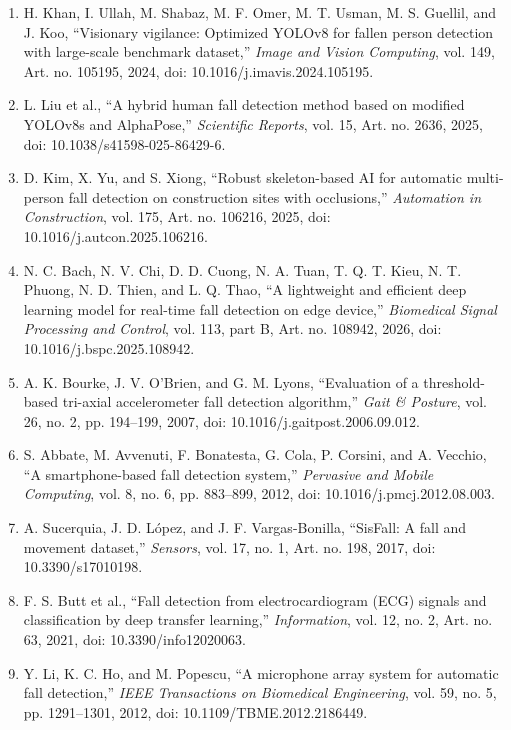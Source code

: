 \begin{enumerate}
    \item \label{ref:falldetection} H. Khan, I. Ullah, M. Shabaz, M. F. Omer, M. T. Usman, M. S. Guellil, and J. Koo, ``Visionary vigilance: Optimized YOLOv8 for fallen person detection with large-scale benchmark dataset,'' \textit{Image and Vision Computing}, vol. 149, Art. no. 105195, 2024, doi: 10.1016/j.imavis.2024.105195.
    \item \label{ref:hfdmia_pose} L. Liu et al., ``A hybrid human fall detection method based on modified YOLOv8s and AlphaPose,'' \textit{Scientific Reports}, vol. 15, Art. no. 2636, 2025, doi: 10.1038/s41598-025-86429-6.
    \item \label{ref:yosap_lstm} D. Kim, X. Yu, and S. Xiong, ``Robust skeleton-based AI for automatic multi-person fall detection on construction sites with occlusions,'' \textit{Automation in Construction}, vol. 175, Art. no. 106216, 2025, doi: 10.1016/j.autcon.2025.106216.
    \item \label{ref:fallnet} N. C. Bach, N. V. Chi, D. D. Cuong, N. A. Tuan, T. Q. T. Kieu, N. T. Phuong, N. D. Thien, and L. Q. Thao, ``A lightweight and efficient deep learning model for real-time fall detection on edge device,'' \textit{Biomedical Signal Processing and Control}, vol. 113, part B, Art. no. 108942, 2026, doi: 10.1016/j.bspc.2025.108942.
    \item \label{ref:bourke_threshold} A. K. Bourke, J. V. O'Brien, and G. M. Lyons, ``Evaluation of a threshold-based tri-axial accelerometer fall detection algorithm,'' \textit{Gait \& Posture}, vol. 26, no. 2, pp. 194--199, 2007, doi: 10.1016/j.gaitpost.2006.09.012.
    \item \label{ref:abbate_smartphone} S. Abbate, M. Avvenuti, F. Bonatesta, G. Cola, P. Corsini, and A. Vecchio, ``A smartphone-based fall detection system,'' \textit{Pervasive and Mobile Computing}, vol. 8, no. 6, pp. 883--899, 2012, doi: 10.1016/j.pmcj.2012.08.003.
    \item \label{ref:sisfall} A. Sucerquia, J. D. López, and J. F. Vargas-Bonilla, ``SisFall: A fall and movement dataset,'' \textit{Sensors}, vol. 17, no. 1, Art. no. 198, 2017, doi: 10.3390/s17010198.
    \item \label{ref:ecg_fall_transfer} F. S. Butt et al., ``Fall detection from electrocardiogram (ECG) signals and classification by deep transfer learning,'' \textit{Information}, vol. 12, no. 2, Art. no. 63, 2021, doi: 10.3390/info12020063.
    \item \label{ref:acoustic_fade} Y. Li, K. C. Ho, and M. Popescu, ``A microphone array system for automatic fall detection,'' \textit{IEEE Transactions on Biomedical Engineering}, vol. 59, no. 5, pp. 1291--1301, 2012, doi: 10.1109/TBME.2012.2186449.

\end{enumerate}
